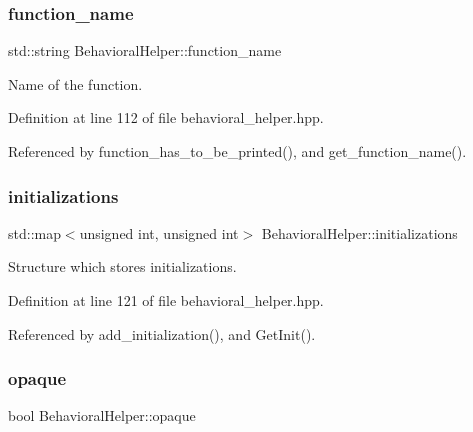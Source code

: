 \subsubsection{\texorpdfstring{function\+\_\+name}{function\_name}}
{\footnotesize\ttfamily std\+::string Behavioral\+Helper\+::function\+\_\+name\hspace{0.3cm}{\ttfamily [protected]}}



Name of the function. 



Definition at line 112 of file behavioral\+\_\+helper.\+hpp.



Referenced by function\+\_\+has\+\_\+to\+\_\+be\+\_\+printed(), and get\+\_\+function\+\_\+name().

\mbox{\label{classBehavioralHelper_a3cf8a4fb0c7b1299b1fad86600afc50e}} 
\subsubsection{\texorpdfstring{initializations}{initializations}}
{\footnotesize\ttfamily std\+::map$<$unsigned int, unsigned int$>$ Behavioral\+Helper\+::initializations\hspace{0.3cm}{\ttfamily [protected]}}



Structure which stores initializations. 



Definition at line 121 of file behavioral\+\_\+helper.\+hpp.



Referenced by add\+\_\+initialization(), and Get\+Init().

\mbox{\label{classBehavioralHelper_a613cef19f77ca26c45a46fe3119bf1c5}} 
\subsubsection{\texorpdfstring{opaque}{opaque}}
{\footnotesize\ttfamily bool Behavioral\+Helper\+::opaque\hspace{0.3cm}{\ttfamily [protected]}}



